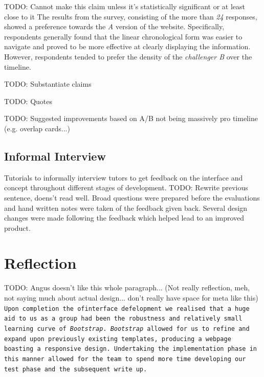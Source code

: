 \documentclass[a4paper, notoc]{tufte-handout}
\begin{document}
TODO: Cannot make this claim unless it's statistically significant or at least close to it
The results from the survey, consisting of the more than \emph{24} responses, showed 
a preference towards the \textit{A} version of the website. Specifically, respondents 
generally found that the linear chronological form was easier to navigate and proved to be more 
effective at clearly displaying the information. However, respondents tended to prefer the density
of the \textit{challenger B} over the timeline. 

TODO: Substantiate claims

TODO: Quotes

TODO: Suggested improvements based on A/B not being massively pro timeline (e.g. overlap cards...)

\subsection{Informal Interview}\label{subsec:interview}

Tutorials to informally interview tutors to get feedback on the interface and concept throughout 
different stages of development. 
TODO: Rewrite previous sentence, doens't read well. 
Broad questions were prepared before the evaluations and hand 
written notes were taken of the feedback given back. Several design changes were made following 
the feedback which helped lead to an improved product.

\section{Reflection}


TODO: Angus doesn't like this whole paragraph... (Not really reflection, meh, not saying much about actual design... don't really have space for meta like this)
\texttt{Upon completion the ofinterface defelopment we realised that a huge aid to us as a group had been 
the robustness and relatively small learning curve of \textit{Bootstrap}. \textit{Bootstrap} 
allowed for us to refine and expand upon previously existing templates, producing a webpage 
boasting a responsive design. Undertaking the implementation phase in this manner allowed for 
the team to spend more time developing our test phase and the subsequent write up.}
\end{document}
